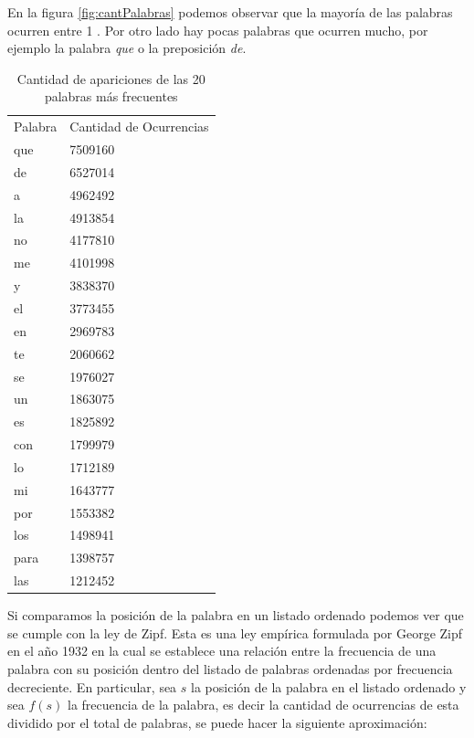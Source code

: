 En la figura \ref{fig:cantPalabras} podemos observar que la mayoría de las palabras ocurren entre 1 . Por otro lado hay pocas palabras que ocurren mucho, por ejemplo la palabra \textit{que} o la preposición \textit{de}.

\begin{table}[ht]
\centering
\caption{Cantidad de apariciones de las 20 palabras más frecuentes}
\label{tabla:palabrasMasOcurrentes}
\begin{tabular}{ll}
Palabra & Cantidad de Ocurrencias \\
que     & 7509160                 \\
de      & 6527014                 \\
a       & 4962492                 \\
la      & 4913854                 \\
no      & 4177810                 \\
me      & 4101998                 \\
y       & 3838370                 \\
el      & 3773455                 \\
en      & 2969783                 \\
te      & 2060662                 \\
se      & 1976027                 \\
un      & 1863075                 \\
es      & 1825892                 \\
con     & 1799979                 \\
lo      & 1712189                 \\
mi      & 1643777                 \\
por     & 1553382                 \\
los     & 1498941                 \\
para    & 1398757                 \\
las     & 1212452                
\end{tabular}
\end{table}

Si comparamos la posición de la palabra en un listado ordenado podemos ver que se cumple con la ley de Zipf. Esta es una ley empírica formulada por George Zipf en el año 1932 en la cual se establece una relación entre la frecuencia de una palabra con su posición dentro del listado de palabras ordenadas por frecuencia decreciente. En particular, sea $s$ la posición de la palabra en el listado ordenado y sea $f(s)$ la frecuencia de la palabra, es decir la cantidad de ocurrencias de esta dividido por el total de palabras, se puede hacer la siguiente aproximación:

